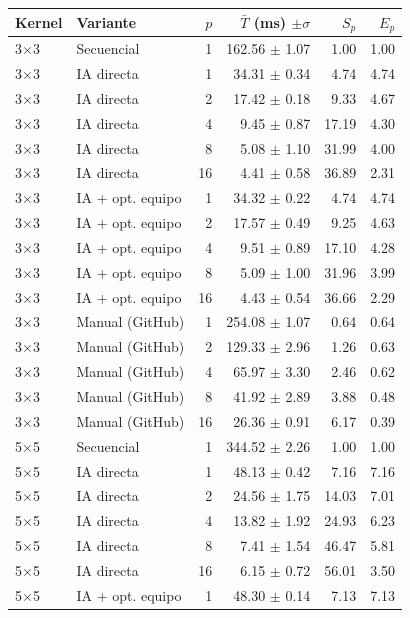 \begin{tabular}{llrrrr}
\toprule
Kernel & Variante & $p$ & $\bar{T}$ (ms) $\pm\sigma$ & $S_p$ & $E_p$ \\
\midrule
3$\times$3 & Secuencial & 1 & 162.56 $\pm$ 1.07 & 1.00 & 1.00 \\
3$\times$3 & IA directa & 1 & 34.31 $\pm$ 0.34 & 4.74 & 4.74 \\
3$\times$3 & IA directa & 2 & 17.42 $\pm$ 0.18 & 9.33 & 4.67 \\
3$\times$3 & IA directa & 4 & 9.45 $\pm$ 0.87 & 17.19 & 4.30 \\
3$\times$3 & IA directa & 8 & 5.08 $\pm$ 1.10 & 31.99 & 4.00 \\
3$\times$3 & IA directa & 16 & 4.41 $\pm$ 0.58 & 36.89 & 2.31 \\
3$\times$3 & IA + opt. equipo & 1 & 34.32 $\pm$ 0.22 & 4.74 & 4.74 \\
3$\times$3 & IA + opt. equipo & 2 & 17.57 $\pm$ 0.49 & 9.25 & 4.63 \\
3$\times$3 & IA + opt. equipo & 4 & 9.51 $\pm$ 0.89 & 17.10 & 4.28 \\
3$\times$3 & IA + opt. equipo & 8 & 5.09 $\pm$ 1.00 & 31.96 & 3.99 \\
3$\times$3 & IA + opt. equipo & 16 & 4.43 $\pm$ 0.54 & 36.66 & 2.29 \\
3$\times$3 & Manual (GitHub) & 1 & 254.08 $\pm$ 1.07 & 0.64 & 0.64 \\
3$\times$3 & Manual (GitHub) & 2 & 129.33 $\pm$ 2.96 & 1.26 & 0.63 \\
3$\times$3 & Manual (GitHub) & 4 & 65.97 $\pm$ 3.30 & 2.46 & 0.62 \\
3$\times$3 & Manual (GitHub) & 8 & 41.92 $\pm$ 2.89 & 3.88 & 0.48 \\
3$\times$3 & Manual (GitHub) & 16 & 26.36 $\pm$ 0.91 & 6.17 & 0.39 \\
\midrule
5$\times$5 & Secuencial & 1 & 344.52 $\pm$ 2.26 & 1.00 & 1.00 \\
5$\times$5 & IA directa & 1 & 48.13 $\pm$ 0.42 & 7.16 & 7.16 \\
5$\times$5 & IA directa & 2 & 24.56 $\pm$ 1.75 & 14.03 & 7.01 \\
5$\times$5 & IA directa & 4 & 13.82 $\pm$ 1.92 & 24.93 & 6.23 \\
5$\times$5 & IA directa & 8 & 7.41 $\pm$ 1.54 & 46.47 & 5.81 \\
5$\times$5 & IA directa & 16 & 6.15 $\pm$ 0.72 & 56.01 & 3.50 \\
5$\times$5 & IA + opt. equipo & 1 & 48.30 $\pm$ 0.14 & 7.13 & 7.13 \\

\end{tabular}
